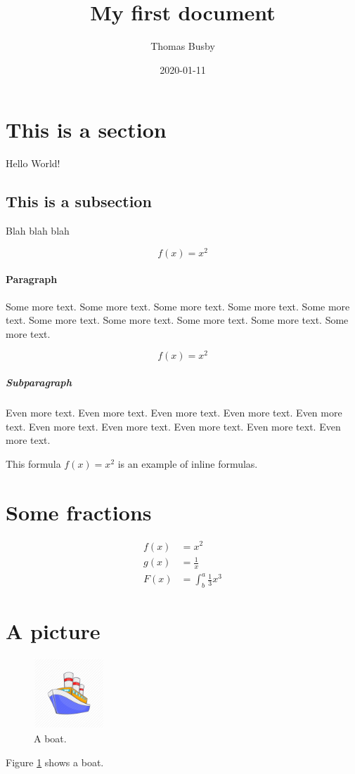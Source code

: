 \documentclass{article}
\title{My first document}
\date{2020-01-11}
\author{Thomas Busby}
\begin{document}
  \maketitle
  \newpage

  \section{This is a section}

  Hello World!

  \subsection{This is a subsection}

  Blah blah blah

  \begin{equation}
    f(x) = x^2
  \end{equation}

  \paragraph{Paragraph}

  Some more text. Some more text. Some more text. Some more text. Some more text. Some more text. Some more text. Some more text. Some more text. Some more text.

  \begin{equation*}
    f(x) = x^2
  \end{equation*}

  \subparagraph{Subparagraph}

  Even more text. Even more text. Even more text. Even more text. Even more text. Even more text. Even more text. Even more text. Even more text. Even more text.

  This formula $f(x) = x^2$ is an example of inline formulas.

  \section{Some fractions}

  \begin{align*}
    f(x) &= x^2\\
    g(x) &= \frac{1}{x}\\
    F(x) &= \int^a_b \frac{1}{3}x^3
  \end{align*}

  \section{A picture}

  \begin{figure}[h!]
    \includegraphics[width=100px]{boat.png}
    \caption{A boat.}
    \label{fig:boat1}
  \end{figure}

  Figure \ref{fig:boat1} shows a boat.
\end{document}
